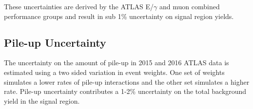 \indent These uncertainties are derived by the ATLAS E/$\gamma$ and muon combined performance groups and result in sub 1\% uncertainty on signal region yields.\cite{MuonReco,EleID} \\

\subsection{Pile-up Uncertainty}

\indent The uncertainty on the amount of pile-up in 2015 and 2016 ATLAS data is estimated using a two sided variation in event weights.  One set of weights simulates a lower rates of pile-up interactions and the other set simulates a higher rate.  Pile-up uncertainty contributes a 1-2\% uncertainty on the total background yield in the signal region.







